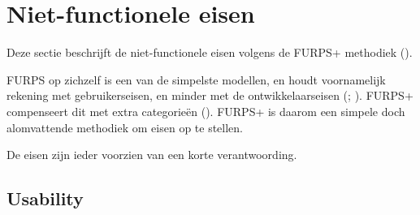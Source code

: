 \section{Niet-functionele eisen}
Deze sectie beschrijft de niet-functionele eisen volgens de FURPS+ methodiek (\cite{furpsplus}).

FURPS op zichzelf is een van de simpelste modellen, en houdt voornamelijk rekening met gebruikerseisen, en minder met de ontwikkelaarseisen (\cite[159]{furps}; \cite{softwarequalitymodels}). FURPS+ compenseert dit met extra categorieën (\cite{furpsplusibm}). FURPS+ is daarom een simpele doch alomvattende methodiek om eisen op te stellen.

De eisen zijn ieder voorzien van een korte verantwoording.

\subsection{Usability}
